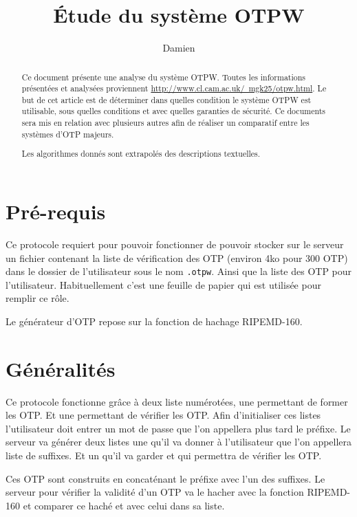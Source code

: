 \documentclass{../res/univ-projet}
\title{\'Etude du syst\`eme OTPW}
\author{Damien \bsc{PICARD}}
\begin{document}
\maketitle

\begin{abstract}
        Ce document présente une analyse du système OTPW. Toutes les
    informations présentées et analysées proviennent 
    \hyperref[de ce site]{http://www.cl.cam.ac.uk/~mgk25/otpw.html}. Le
    but de cet article est de déterminer dans quelles condition le
    système OTPW est utilisable, sous quelles conditions et avec quelles 
    garanties de sécurité.
    Ce documents sera mis en relation avec plusieurs autres afin de réaliser un
    comparatif entre les systèmes d'OTP majeurs.

    Les algorithmes donnés sont extrapolés des descriptions textuelles.
\end{abstract}
\newpage
\tableofcontents
\newpage

\section{Pré-requis}
        Ce protocole requiert pour pouvoir fonctionner de pouvoir stocker
    sur le serveur un fichier contenant la liste de vérification des OTP (environ 
    4ko pour 300 OTP) dans le dossier de l'utilisateur sous le nom \verb?.otpw?.
    Ainsi que la liste des OTP pour l'utilisateur. Habituellement
    c'est une feuille de papier qui est utilisée pour remplir ce rôle.

        Le générateur d'OTP repose sur la fonction de hachage RIPEMD-160.

\section{Généralités}
        Ce protocole fonctionne grâce à deux liste numérotées, une permettant 
    de former les OTP. Et une permettant de vérifier les OTP. Afin d'initialiser
    ces listes l'utilisateur doit entrer un mot de passe que l'on appellera plus
    tard le préfixe. Le serveur va générer deux listes une qu'il va donner à
    l'utilisateur que l'on appellera liste de suffixes. Et un qu'il va garder
    et qui permettra de vérifier les OTP.

        Ces OTP sont construits en concaténant le préfixe avec l'un des suffixes.
    Le serveur pour vérifier la validité d'un OTP va le hacher avec la fonction
    RIPEMD-160 et comparer ce haché et avec celui dans sa liste.
\end{document}
